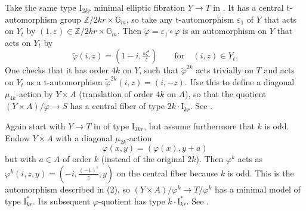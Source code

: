 \documentclass[reqno, letterpaper]{amsart}
\numberwithin{equation}{subsection}
\let\to\longrightarrow
\newcommand{\GG}{\mathbb{G}}
\newcommand{\ZZ}{\mathbb{Z}}
\begin{document}
	\begin{example} [Type $m \cdot \mathrm I^-_R$ for $m = 2k$ and $R = kr$]
		Take the same type $\mathrm I_{2kr}$ minimal elliptic fibration $Y \to T$ in . It has a central t-automorphism group $\ZZ/2kr \times \GG_m$, so take any t-automorphism $\varepsilon_1$ of $Y$ that acts on $Y_t$ by $(1, \varepsilon) \in \ZZ/2kr \times \GG_m$. Then $\tilde \varphi = \varepsilon_1 \circ \varphi$ is an automorphism on $Y$ that acts on $Y_t$ by
		\[ \tilde \varphi (i,z) = (1-i, \tfrac{\varepsilon \zeta^i}{z}) \qquad\mbox{for}\quad (i,z) \in Y_t .\]
		One checks that it has order $4k$ on $Y$, such that $\tilde \varphi^{2k}$ acts trivially on $T$ and acts on $Y_t$ as a t-automorphism $\tilde \varphi^{2k}(i,z) = (i, -z)$. Use this to define a diagonal $\mu_{4k}$-action by $Y \times A$ (translation of order $4k$ on $A$), so that the quotient $(Y \times A)/\tilde \varphi \to S$ has a central fiber of type $2k \cdot \mathrm I^-_{kr}$. See .
	\end{example}
	
	\begin{example} [Type $m \cdot \mathrm I_R^*$ for odd $m = k$ and $R = kr$]
		Again start with $Y \to T$ in  of type $\mathrm I_{2kr}$, but assume furthermore that $k$ is odd. Endow $Y \times A$ with a diagonal $\mu_{2k}$-action
		\[ \varphi(x,y) = (\varphi(x), y+a) \]
		but with $a \in A$ of order $k$ (instead of the original $2k$). Then $\varphi^k$ acts as $\varphi^k (i,z,y) = (-i, \frac{(-1)^i}{z}, y)$ on the central fiber because $k$ is odd. This is the automorphism described in (2), so $(Y \times A)/\varphi^k \to T/\varphi^k$ has a minimal model of type $\mathrm I_{kr}^*$. Its subsequent $\varphi$-quotient has type $k \cdot \mathrm I_{kr}^*$. See .
	\end{example}
	
\end{document}
